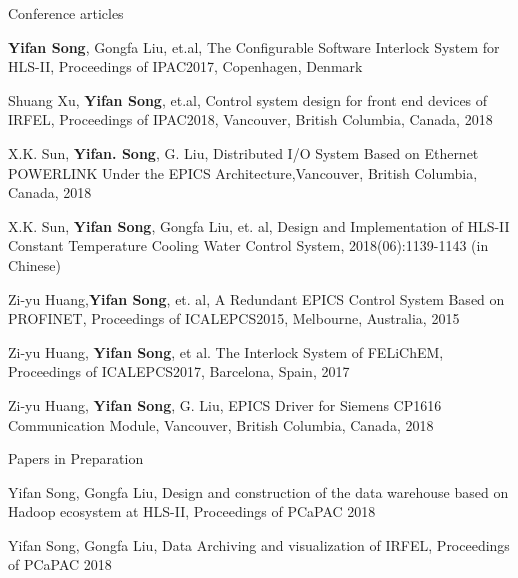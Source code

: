 \begin{cventries}
\cventry
   {Conference articles} %
   {} %
   {} %
   {} %
   {
   	\begin{cvitems} %
   		\item {\textbf{Yifan Song}, Gongfa Liu, et.al, The Configurable Software Interlock System for HLS-II, Proceedings of IPAC2017, Copenhagen, Denmark}
   		\item {Shuang Xu, \textbf{Yifan Song}, et.al, Control system design for front end devices of IRFEL, Proceedings of IPAC2018, Vancouver, British Columbia, Canada, 2018}
   		\item{X.K. Sun, \textbf{Yifan. Song}, G. Liu, Distributed I/O System Based on Ethernet POWERLINK Under the EPICS Architecture,Vancouver, British Columbia, Canada, 2018}
   		\item{X.K. Sun, \textbf{Yifan Song}, Gongfa Liu, et. al, Design and Implementation of HLS-II Constant Temperature Cooling Water Control System, 2018(06):1139-1143 (in Chinese)}
   		\item {Zi-yu Huang,\textbf{Yifan Song}, et. al, A Redundant EPICS Control System Based on PROFINET, Proceedings of ICALEPCS2015, Melbourne, Australia, 2015}
   		\item {Zi-yu Huang, \textbf{Yifan Song}, et al. The Interlock System of FELiChEM, Proceedings of ICALEPCS2017, Barcelona, Spain, 2017}
   		\item {Zi-yu Huang, \textbf{Yifan Song}, G. Liu, EPICS Driver for Siemens CP1616 Communication Module, Vancouver, British Columbia, Canada, 2018}
   	\end{cvitems}
   }

  \cventry
    {Papers in Preparation} %
    {} %
    {} %
    {} %
    {
      \begin{cvitems} %
        \item {Yifan Song, Gongfa Liu, Design and construction of the data warehouse based on Hadoop ecosystem at HLS-II, Proceedings of PCaPAC 2018}
        \item {Yifan Song, Gongfa Liu, Data Archiving and visualization of IRFEL, Proceedings of PCaPAC 2018}
      \end{cvitems}
    }
   
\end{cventries}
